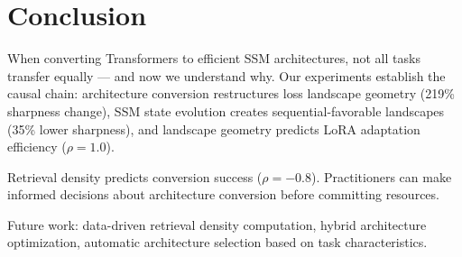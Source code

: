 \section{Conclusion}

When converting Transformers to efficient SSM architectures, not all tasks transfer equally --- and now we understand why. Our experiments establish the causal chain: architecture conversion restructures loss landscape geometry (219\% sharpness change), SSM state evolution creates sequential-favorable landscapes (35\% lower sharpness), and landscape geometry predicts LoRA adaptation efficiency ($\rho=1.0$).

Retrieval density predicts conversion success ($\rho=-0.8$). Practitioners can make informed decisions about architecture conversion before committing resources.

Future work: data-driven retrieval density computation, hybrid architecture optimization, automatic architecture selection based on task characteristics.
